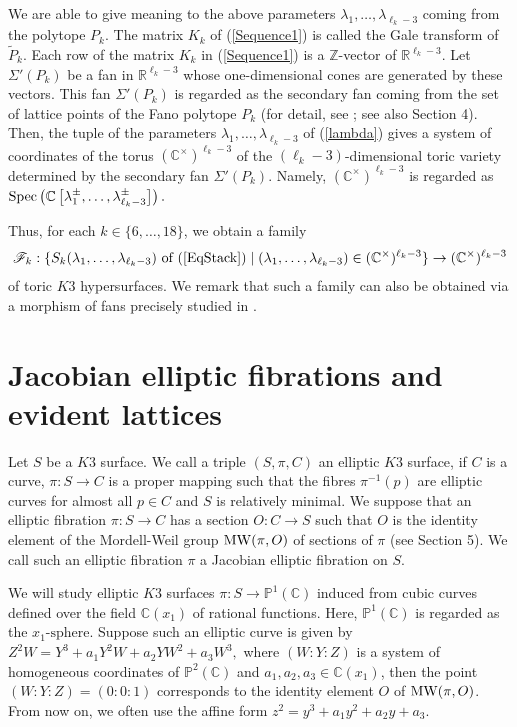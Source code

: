 \documentclass[10pt]{article}
\begin{document}
We are able to give meaning to the above parameters $\lambda_1,\ldots, \lambda_{\ell_k-3}$ coming from the polytope $P_k$.
The matrix $K_k$ of (\ref{Sequence1}) is called the Gale transform of $\widetilde{P}_k$.
Each row of the matrix $K_k$ in (\ref{Sequence1}) is a $\mathbb{Z}$-vector of $\mathbb{R}^{\ell_k-3}$.
Let  $\Sigma'(P_k)$ be a fan in $\mathbb{R}^{\ell_k-3}$ 
whose one-dimensional cones are generated by these vectors.
This fan $\Sigma'(P_k)$ is regarded as  the secondary fan coming from  the set of  lattice points of the Fano polytope $P_k$
(for detail, see \cite{GKZ}; see also \cite{BFS} Section 4).
Then, the tuple of the parameters $\lambda_1,\ldots, \lambda_{\ell_k-3}$ of (\ref{lambda}) gives a system of coordinates of the torus $(\mathbb{C}^\times)^{\ell_k-3}$ of the $(\ell_k-3)$-dimensional toric variety determined by the secondary fan $\Sigma' (P_k)$.
Namely,  $(\mathbb{C}^\times)^{\ell_k-3}$ is regarded as ${\rm Spec}\left(\mathbb{C}\left[\lambda_1^{\pm},\ldots, \lambda_{\ell_k-3}^{\pm}\right]\right).$


Thus,
for each $k \in \{6,\ldots, 18\}$,
we obtain a family 
\begin{align}\label{Family}
\mathscr{F}_k: \{S_k (\lambda_1,\ldots, \lambda_{\ell_k-3}) \text{ of (\ref{EqStack})} \mid (\lambda_1,\ldots, \lambda_{\ell_k-3})\in (\mathbb{C}^\times)^{\ell_k-3} \} \rightarrow (\mathbb{C}^\times)^{\ell_k-3}
\end{align}
of toric $K3$ hypersurfaces.
We remark that such a family can  also be obtained via a morphism of fans precisely studied in \cite{Lafforgue}. 


 
 \section{Jacobian elliptic fibrations and evident lattices}

 Let $S$ be a $K3$ surface.
 We call a triple $(S,\pi,C)$ an elliptic $K3$ surface, 
 if $C$ is a curve, $\pi:S\rightarrow C$ is a proper mapping such that the fibres  $\pi^{-1}(p)$ are elliptic curves for almost all $p\in C$  and $S$ is relatively minimal.
We suppose that an elliptic fibration $\pi:S\rightarrow C$ has a section $O:C\rightarrow S$ such that $O$ is the identity element of the Mordell-Weil group ${\rm MW}(\pi,O)$ of sections of $\pi$ (see  Section 5).
We call such an elliptic fibration $\pi$ a Jacobian elliptic fibration on $S$.
 
 We will study elliptic $K3$ surfaces $\pi:S\rightarrow \mathbb{P}^1(\mathbb{C}) $ induced from  cubic curves defined over the field $\mathbb{C}(x_1)$ of rational functions. 
 Here, $\mathbb{P}^1(\mathbb{C}) $ is regarded as the $x_1\text{-sphere}$.
 Suppose such an  elliptic curve is given by 
 $
 Z^2 W = Y^3 + a_1 Y^2 W + a_2 Y W^2 + a_3 W^3,
 $
 where $(W: Y: Z) $ is a system of homogeneous coordinates of $\mathbb{P}^2(\mathbb{C})$ and $a_1,a_2,a_3\in \mathbb{C}(x_1)$,
 then the point $(W:Y:Z)=(0:0:1)$ corresponds to the identity element $O$  of ${\rm MW}(\pi,O)$.
 From now on, we often use the affine form
 $
 z^2 = y^3 + a_1 y^2  + a_2 y  + a_3.
 $
 
\end{document}
